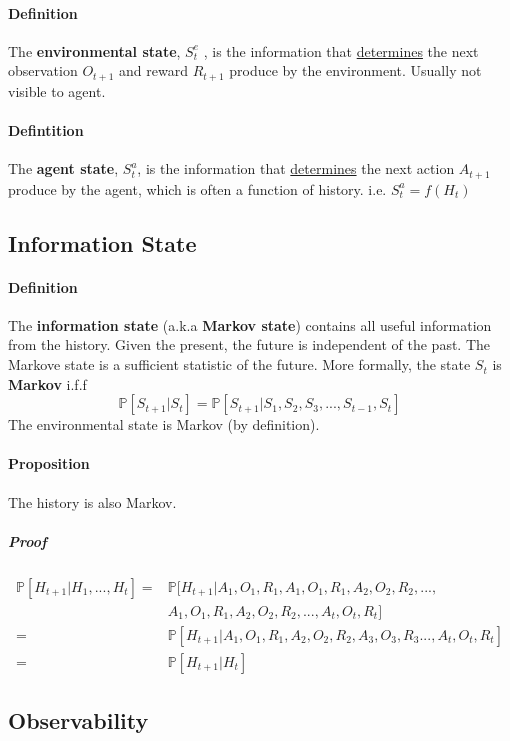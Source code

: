 	\paragraph{Definition} The \textbf{environmental state}, $S^e_t$ , is the information that \underline{determines} the next observation $O_{t+1}$ and reward $R_{t+1}$ produce by the environment. Usually not visible to agent.

	\paragraph{Defintition} The \textbf{agent state}, $S^a_t$, is the information that \underline{determines} the next action $A_{t+1}$ produce by the agent, which is often a function of history. i.e. $S^a_t = f(H_t)$

	\subsection{Information State}
	\paragraph{Definition} The \textbf{information state} (a.k.a \textbf{Markov state}) contains all useful information from the history. Given the present, the future is independent of the past. The Markove state is a sufficient statistic of the future.  More formally, the state $S_t$ is \textbf{Markov} i.f.f 
	\begin{equation}
	\mathbb{P} [S_{t+1} | S_t] = \mathbb{P} [S_{t+1} | S_1, S_2, S_3, ..., S_{t-1}, S_t]
	\end{equation}
	The environmental state is Markov (by definition). 
	\paragraph{Proposition} The history is also Markov. 
	\subparagraph{Proof}
	\begin{align*}
	\mathbb{P} [H_{t+1} | H_1, ..., H_t]
	=  &\mathbb{P} [H_{t+1} | A_1, O_1, R_1, A_1, O_1, R_1, A_2, O_2, R_2, ... ,\\
	 	&A_1, O_1, R_1, A_2, O_2, R_2, ..., A_t, O_t, R_t ] \\
	= &\mathbb{P} [H_{t+1} | A_1, O_1, R_1, A_2, O_2, R_2, A_3, O_3, R_3 ..., A_t, O_t, R_t ] \\
	= &\mathbb{P} [H_{t+1} | H_t]
	\end{align*} 

	\subsection{Observability}

